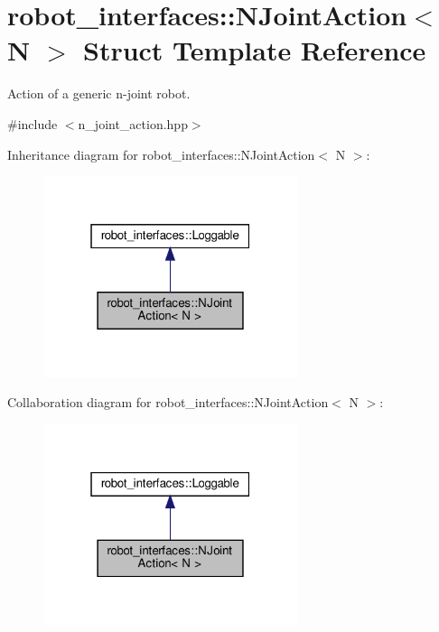 \hypertarget{structrobot__interfaces_1_1NJointAction}{}\section{robot\+\_\+interfaces\+:\+:N\+Joint\+Action$<$ N $>$ Struct Template Reference}
\label{structrobot__interfaces_1_1NJointAction}


Action of a generic n-\/joint robot.  




{\ttfamily \#include $<$n\+\_\+joint\+\_\+action.\+hpp$>$}



Inheritance diagram for robot\+\_\+interfaces\+:\+:N\+Joint\+Action$<$ N $>$\+:
\nopagebreak
\begin{figure}[H]
\begin{center}
\leavevmode
\includegraphics[width=211pt]{structrobot__interfaces_1_1NJointAction__inherit__graph}
\end{center}
\end{figure}


Collaboration diagram for robot\+\_\+interfaces\+:\+:N\+Joint\+Action$<$ N $>$\+:
\nopagebreak
\begin{figure}[H]
\begin{center}
\leavevmode
\includegraphics[width=211pt]{structrobot__interfaces_1_1NJointAction__coll__graph}
\end{center}
\end{figure}

